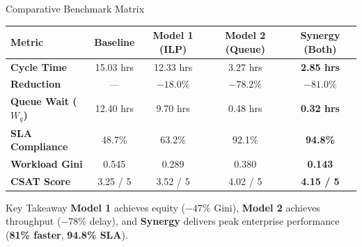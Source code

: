 \documentclass[10pt,aspectratio=169]{beamer}
\begin{document}
\begin{frame}{Comparative Benchmark Matrix}
    \centering
    \small
    \vspace{0.1cm}
    \begin{table}[]
        \begin{tabular}{lcccc}
            \toprule
            \textbf{Metric} & \textbf{Baseline} & \textbf{Model 1 (ILP)} & \textbf{Model 2 (Queue)} & \textbf{Synergy (Both)} \\
            \midrule
            \textbf{Cycle Time} & 15.03 hrs & 12.33 hrs & 3.27 hrs & \textbf{2.85 hrs} \\
            \textbf{Reduction} & --- & $-18.0\%$ & $-78.2\%$ & \textbf{$-81.0\%$} \\
            \textbf{Queue Wait ($W_q$)} & 12.40 hrs & 9.70 hrs & 0.48 hrs & \textbf{0.32 hrs} \\
            \textbf{SLA Compliance} & 48.7\% & 63.2\% & 92.1\% & \textbf{94.8\%} \\
            \textbf{Workload Gini} & 0.545 & 0.289 & 0.380 & \textbf{0.143} \\
            \textbf{CSAT Score} & 3.25 / 5 & 3.52 / 5 & 4.02 / 5 & \textbf{4.15 / 5} \\
            \bottomrule
        \end{tabular}
    \end{table}
    \vspace{0.3cm}
    \begin{block}{Key Takeaway}
        \centering
        \textbf{Model 1} achieves equity ($-47\%$ Gini), \textbf{Model 2} achieves throughput ($-78\%$ delay), and \textbf{Synergy} delivers peak enterprise performance (\textbf{81\% faster}, \textbf{94.8\% SLA}).
    \end{block}
\end{frame}
\end{document}
